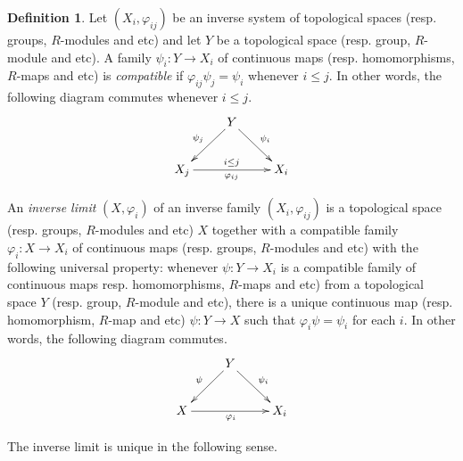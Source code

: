 \documentclass[12pt]{report}
\theoremstyle{definition}
\newtheorem{definition}[theorem]{Definition}
\begin{document}
\begin{definition}
	Let $(X_i,\varphi_{ij})$ be an inverse system of topological spaces (resp. groups, $R$-modules and etc) and let $Y$ be a topological space (resp. group, $R$-module and etc). A family $\psi_i:Y\to X_i$ of continuous maps (resp. homomorphisms, $R$-maps and etc) is \emph{compatible} if $\varphi_{ij}\psi_j=\psi_i$ whenever $i\leq j$. In other words, the following diagram commutes whenever $i\leq j$.
	$$\xymatrix{
		& Y\ar[dl]_{\psi_j}\ar[dr]^{\psi_i} &    \\
		X_j\ar[rr]^{i\leq j}_{\varphi_{ij}}& & X_i }
	$$


	An \emph{inverse limit} $(X,\varphi_i)$ of an inverse family $(X_i,\varphi_{ij})$ is a topological space (resp. groups, $R$-modules and etc) $X$ together with a compatible family $\varphi_i: X\to X_i$ of continuous maps (resp. groups, $R$-modules and etc) with the following universal property: whenever $\psi:Y\to X_i$ is a compatible family of continuous maps resp. homomorphisms, $R$-maps and etc) from a topological space $Y$ (resp. group, $R$-module and etc), there is a unique continuous map (resp. homomorphism, $R$-map and etc) $\psi: Y\to X$ such that $\varphi_i\psi =\psi_i$ for each $i$.  In other words, the following diagram commutes.
	$$\xymatrix{
		& Y\ar[dl]_{\psi}\ar[dr]^{\psi_i} &    \\
		X\ar[rr]_{\varphi_{i}}& & X_i }
	$$
\end{definition}

The inverse limit is unique in the following sense.
\end{document}
